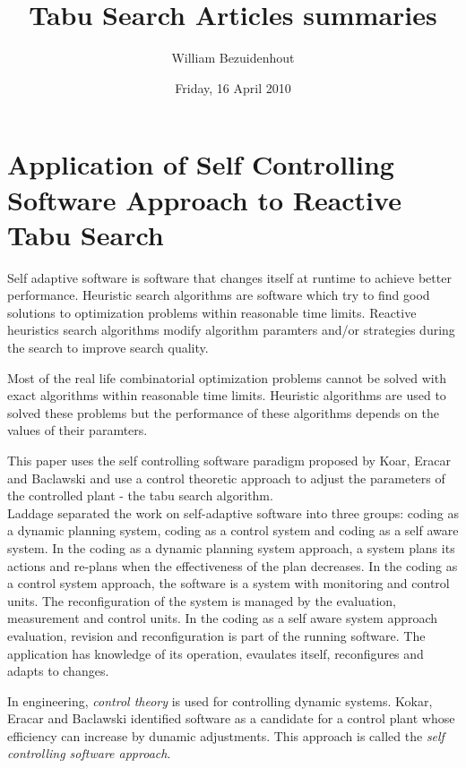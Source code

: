 \documentclass[pdftex,11pt]{article}
\title{Tabu Search Articles summaries}
\author{William Bezuidenhout}
\date{Friday, 16 April 2010}
\begin{document}
\maketitle
\section*{Application of Self Controlling Software Approach to Reactive Tabu Search}
Self adaptive software is software that changes itself at runtime to achieve better performance. Heuristic search algorithms are software which try to find good solutions to optimization problems within reasonable time limits. Reactive heuristics search algorithms modify algorithm paramters and/or strategies during the search to improve search quality.

Most of the real life combinatorial optimization problems cannot be solved with exact algorithms within reasonable time limits. Heuristic algorithms are used to solved these problems but the performance of these algorithms depends on the values of their paramters.

This paper uses the self controlling software paradigm proposed by Koar, Eracar and Baclawski and use a control theoretic approach to adjust the parameters of the controlled plant - the tabu search algorithm.\\

Laddage separated the work on self-adaptive software into three groups: coding as a dynamic planning system, coding as a control system and coding as a self aware system. In the coding as a dynamic planning system approach, a system plans its actions and re-plans when the effectiveness of the plan decreases. In the coding as a control system approach, the software is a system with monitoring and control units. The reconfiguration of the system is managed by the evaluation, measurement and control units. In the coding as a self aware system approach evaluation, revision and reconfiguration is part of the running software. The application has knowledge of its operation, evaulates itself, reconfigures and adapts to changes.

In engineering, \textit{control theory} is used for controlling dynamic systems. Kokar, Eracar and Baclawski identified software as a candidate for a control plant whose efficiency can increase by dunamic adjustments. This approach is called the \emph{self controlling software approach}.
\end{document}
